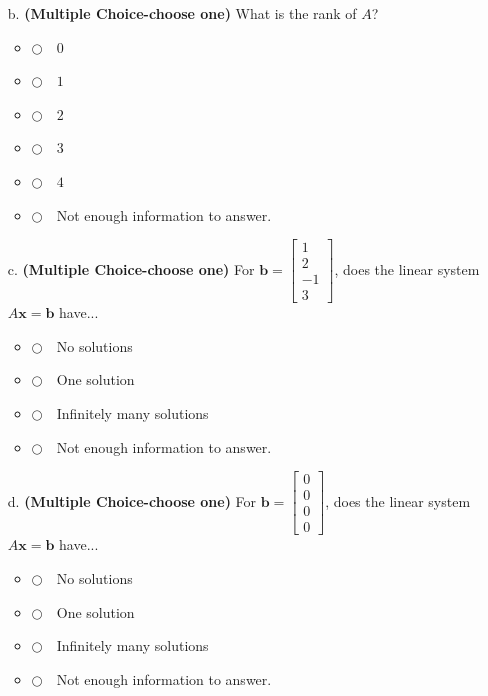 \documentclass[12pt]{extarticle}
\newcommand{\chooseone}{{\Large$\Circle$\ \ }}
\begin{document}
\begin{enumerate}
\begin{itemize}
     \vfill

     \item[b.] \textbf{(Multiple Choice-choose one)}  What is the rank of $A$?
\begin{itemize}[label={}]
\item \chooseone $0$
\item \chooseone $1$
\item \chooseone $2$
\item \chooseone $3$
\item \chooseone $4$
\item \chooseone Not enough information to answer.
\end{itemize}  
     \vfill


     \item[c.] \textbf{(Multiple Choice-choose one)} For $\mathbf{b}=\begin{bmatrix} 1 \\ 2\\ -1 \\ 3\end{bmatrix}$, does the linear system $A\mathbf{x}=\mathbf{b}$ have...
\begin{itemize}[label={}]
\item \chooseone No solutions
\item \chooseone One solution
\item \chooseone Infinitely many solutions
\item \chooseone Not enough information to answer.
\end{itemize}    
     
     \vfill


\item[d.] \textbf{(Multiple Choice-choose one)} For $\mathbf{b}=\begin{bmatrix} 0 \\ 0\\ 0 \\ 0\end{bmatrix}$, does the linear system $A\mathbf{x}=\mathbf{b}$ have...
\begin{itemize}[label={}]
\item \chooseone No solutions
\item \chooseone One solution
\item \chooseone Infinitely many solutions
\item \chooseone Not enough information to answer.
\end{itemize}    
\end{itemize}


    
    





    


\newpage


    


    

    
    
    
        \newpage
\end{enumerate}
\end{document}

